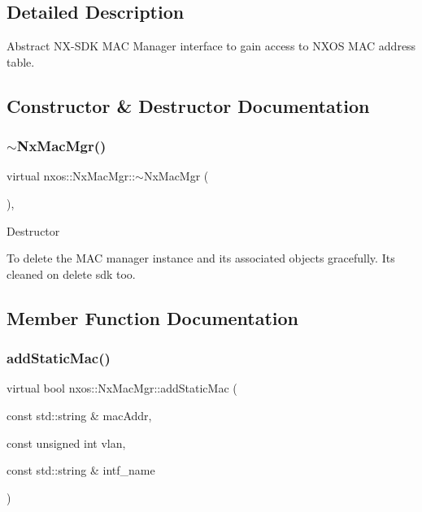 \subsection{Detailed Description}
Abstract N\+X-\/\+S\+DK M\+AC Manager interface to gain access to N\+X\+OS M\+AC address table. 

\subsection{Constructor \& Destructor Documentation}
\mbox{\label{classnxos_1_1_nx_mac_mgr_a850cc17a798501d3e5e1aea213bb2a41}} 
\subsubsection{\texorpdfstring{$\sim$\+Nx\+Mac\+Mgr()}{~NxMacMgr()}}
{\footnotesize\ttfamily virtual nxos\+::\+Nx\+Mac\+Mgr\+::$\sim$\+Nx\+Mac\+Mgr (\begin{DoxyParamCaption}{ }\end{DoxyParamCaption})\hspace{0.3cm}{\ttfamily [inline]}, {\ttfamily [virtual]}}

Destructor

To delete the M\+AC manager instance and its associated objects gracefully. Its cleaned on delete sdk too. 

\subsection{Member Function Documentation}
\mbox{\label{classnxos_1_1_nx_mac_mgr_a688eeadbbf960420b24eb13883f77008}} 
\subsubsection{\texorpdfstring{add\+Static\+Mac()}{addStaticMac()}}
{\footnotesize\ttfamily virtual bool nxos\+::\+Nx\+Mac\+Mgr\+::add\+Static\+Mac (\begin{DoxyParamCaption}\item[{const std\+::string \&}]{mac\+Addr,  }\item[{const unsigned int}]{vlan,  }\item[{const std\+::string \&}]{intf\+\_\+name }\end{DoxyParamCaption})\hspace{0.3cm}{\ttfamily [pure virtual]}}

